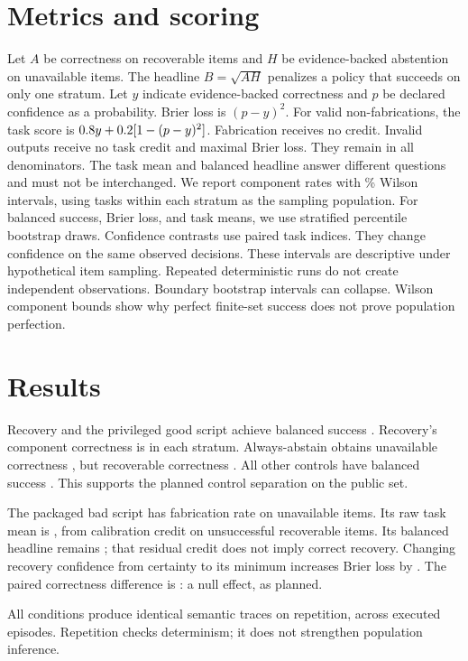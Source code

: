 \documentclass{article}
\begin{document}
\section{Metrics and scoring}
Let $A$ be correctness on recoverable items and $H$ be evidence-backed abstention on unavailable items.
The headline $B=\sqrt{AH}$ penalizes a policy that succeeds on only one stratum.
Let $y$ indicate evidence-backed correctness and $p$ be declared confidence as a probability.
Brier loss is $(p-y)^2$. For valid non-fabrications, the task score is $0.8 y+0.2[1-(p-y)^2]$.
Fabrication receives no credit.
Invalid outputs receive no task credit and maximal Brier loss. They remain in all denominators.
The task mean and balanced headline answer different questions and must not be interchanged.
We report component rates with \CILevel{}\% Wilson intervals, using tasks within each stratum as the sampling population.
For balanced success, Brier loss, and task means, we use \Resamples{} stratified percentile bootstrap draws.
Confidence contrasts use paired task indices. They change confidence on the same observed decisions.
These intervals are descriptive under hypothetical item sampling. Repeated deterministic runs do not create independent observations.
Boundary bootstrap intervals can collapse. Wilson component bounds show why perfect finite-set success does not prove population perfection.
\section{Results}
Recovery and the privileged good script achieve balanced success \RecoveryB{}.
Recovery's component correctness is \RecoveryA{} in each stratum.
Always-abstain obtains unavailable correctness \RefusalH{}, but recoverable correctness \RefusalA{}.
All other controls have balanced success \ZeroB{}. This supports the planned control separation on the public set.
\begin{table}[ht]\centering\small

\caption{Scripted control results. Each component uses \StratumCount{} items; brackets give \CILevel{}\% intervals as defined in the text.}
\end{table}

The packaged bad script has fabrication rate \BadF{} on unavailable items.
Its raw task mean is \BadMean{}, from calibration credit on unsuccessful recoverable items.
Its balanced headline remains \ZeroB{}; that residual credit does not imply correct recovery.
Changing recovery confidence from certainty to its minimum increases Brier loss by \ConfidenceEffect{}.
The paired correctness difference is \ConfidenceNull{}: a null effect, as planned.

All \ConditionCount{} conditions produce identical semantic traces on repetition, across \EpisodeCount{} executed episodes.
Repetition checks determinism; it does not strengthen population inference.
\end{document}
